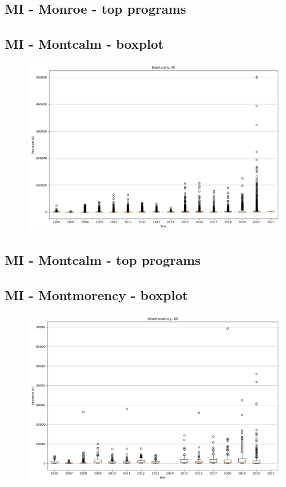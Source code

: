 \subsection*{MI - Monroe - top programs}

\newpage
\subsection*{MI - Montcalm - boxplot}
\begin{figure}[h]
\centering
\includegraphics[width=7in]{../output/boxplots/counties/Montcalm-MI_boxplot.png}
\end{figure}


\subsection*{MI - Montcalm - top programs}

\newpage
\subsection*{MI - Montmorency - boxplot}
\begin{figure}[h]
\centering
\includegraphics[width=7in]{../output/boxplots/counties/Montmorency-MI_boxplot.png}
\end{figure}


